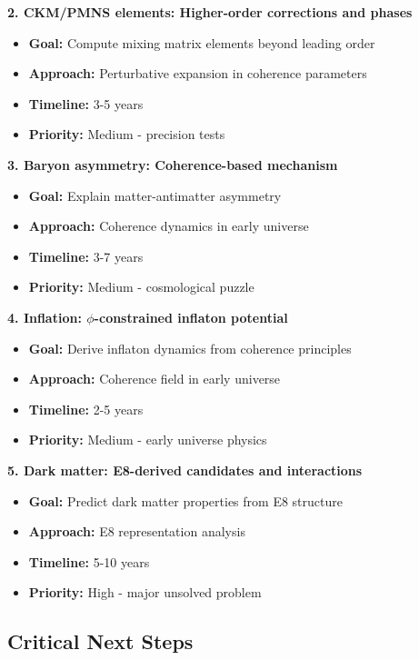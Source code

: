 \documentclass[11pt]{article}
\theoremstyle{definition}
\newcommand{\goldenratio}{\phi}
\begin{document}
\textbf{2. CKM/PMNS elements: Higher-order corrections and phases}
\begin{itemize}
\item \textbf{Goal:} Compute mixing matrix elements beyond leading order
\item \textbf{Approach:} Perturbative expansion in coherence parameters
\item \textbf{Timeline:} 3-5 years
\item \textbf{Priority:} Medium - precision tests
\end{itemize}

\textbf{3. Baryon asymmetry: Coherence-based mechanism}
\begin{itemize}
\item \textbf{Goal:} Explain matter-antimatter asymmetry
\item \textbf{Approach:} Coherence dynamics in early universe
\item \textbf{Timeline:} 3-7 years
\item \textbf{Priority:} Medium - cosmological puzzle
\end{itemize}

\textbf{4. Inflation: $\goldenratio$-constrained inflaton potential}
\begin{itemize}
\item \textbf{Goal:} Derive inflaton dynamics from coherence principles
\item \textbf{Approach:} Coherence field in early universe
\item \textbf{Timeline:} 2-5 years
\item \textbf{Priority:} Medium - early universe physics
\end{itemize}

\textbf{5. Dark matter: E8-derived candidates and interactions}
\begin{itemize}
\item \textbf{Goal:} Predict dark matter properties from E8 structure
\item \textbf{Approach:} E8 representation analysis
\item \textbf{Timeline:} 5-10 years
\item \textbf{Priority:} High - major unsolved problem
\end{itemize}

\subsection{Critical Next Steps}
\end{document}
